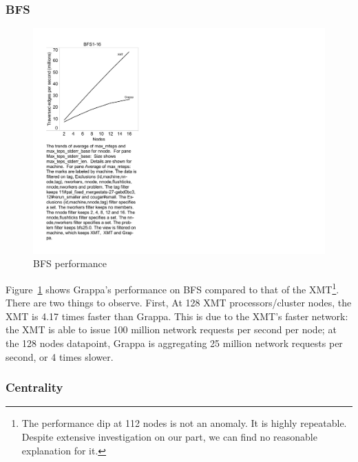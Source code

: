 
\subsubsection{BFS}

\begin{figure}[tH]
\begin{center}
  \includegraphics[width=0.95\columnwidth]{figs/bfs_performance}
\begin{minipage}{0.95\columnwidth}
  \caption{\label{fig:bfs-performance} BFS performance}
\end{minipage}
\vspace{-3ex}
\end{center}
\end{figure}

Figure~\ref{fig:bfs-performance} shows Grappa's performance on BFS
compared to that of the XMT\footnote{The performance dip at 112 nodes is not an anomaly.  It is highly repeatable.  Despite extensive investigation on our part, we can find no reasonable explanation for it.}. There are
two things to observe. First, At 128 XMT processors/cluster nodes,
the XMT is  4.17 times faster than Grappa. This is due to the
XMT's faster network: the XMT is able to issue 100 million network
requests per second per node; at the 128 nodes datapoint, Grappa is
aggregating 25 million network requests per second, or 4 times slower.

\subsubsection{Centrality}


